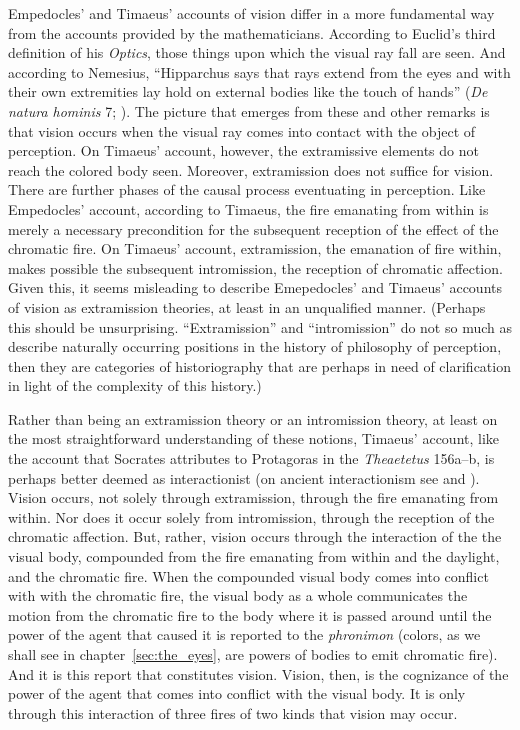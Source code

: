 Empedocles' and Timaeus' accounts of vision differ in a more fundamental way from the accounts provided by the mathematicians. According to Euclid's third definition of his \emph{Optics}, those things upon which the visual ray fall are seen. And according to Nemesius, ``Hipparchus says that rays extend from the eyes and with their own extremities lay hold on external bodies like the touch of hands'' (\emph{De natura hominis} 7; \citealt[104]{Sharples:2008aa}). The picture that emerges from these and other remarks is that vision occurs when the visual ray comes into contact with the object of perception. On Timaeus' account, however, the extramissive elements do not reach the colored body seen. Moreover, extramission does not suffice for vision. There are further phases of the causal process eventuating in perception. Like Empedocles' account, according to Timaeus, the fire emanating from within is merely a necessary precondition for the subsequent reception of the effect of the chromatic fire. On Timaeus' account, extramission, the emanation of fire within, makes possible the subsequent intromission, the reception of chromatic affection. Given this, it seems misleading to describe Emepedocles' and Timaeus' accounts of vision as extramission theories, at least in an unqualified manner. (Perhaps this should be unsurprising. ``Extramission'' and ``intromission'' do not so much as describe naturally occurring positions in the history of philosophy of perception, then they are categories of historiography that are perhaps in need of clarification in light of the complexity of this history.)

Rather than being an extramission theory or an intromission theory, at least on the most straightforward understanding of these notions, Timaeus' account, like the account that Socrates attributes to Protagoras in the \emph{Theaetetus} 156a--b, is perhaps better deemed as interactionist (on ancient interactionism see  \citealt{Remes:2014en} and \citealt{Squire:2016aa}). Vision occurs, not solely through extramission, through the fire emanating from within. Nor does it occur solely from intromission, through the reception of the chromatic affection. But, rather, vision occurs through the interaction of the the visual body, compounded from the fire emanating from within and the daylight, and the chromatic fire. When the compounded visual body comes into conflict with with the chromatic fire, the visual body as a whole communicates the motion from the chromatic fire to the body where it is passed around until the power of the agent that caused it is reported to the \emph{phronimon} (colors, as we shall see in chapter~\ref{sec:the_eyes}, are powers of bodies to emit chromatic fire). And it is this report that constitutes vision. Vision, then, is the cognizance of the power of the agent that comes into conflict with the visual body. It is only through this interaction of three fires of two kinds that vision may occur.






